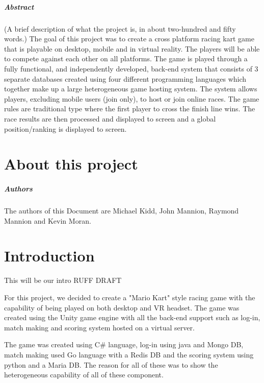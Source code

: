 
\paragraph{Abstract}
(A brief description of what the project is, in about two-hundred and fifty words.) 
The goal of this project was to create a cross platform racing kart game that is playable on desktop, mobile and in virtual reality. The players will be able to compete against each other on all platforms. The game is played through a fully functional, and independently developed, back-end system that consists of 3 separate databases created using four different programming languages which together make up a large heterogeneous game hosting system. The system allows players, excluding mobile users (join only), to host or join online races. The game rules are traditional type where the first player to cross the finish line wins. The race results are then processed and displayed to screen and a global position/ranking is displayed to screen.

\chapter*{About this project}

\paragraph{Authors}
The authors of this Document are Michael Kidd, John Mannion, Raymond Mannion and Kevin Moran.

\chapter{Introduction}
This will be our intro RUFF DRAFT


For this project, we decided to create a "Mario Kart" style racing game 
with the capability of being played on both desktop and VR headset. The game was created using the Unity game engine with all the back-end support such as log-in, match making and scoring system hosted on a virtual server.

The game was created using C# language, log-in using java and Mongo DB,
match making used Go language with a Redis DB and the scoring system using python and a Maria DB. The reason for all of these was to show the heterogeneous capability of all of these component.
